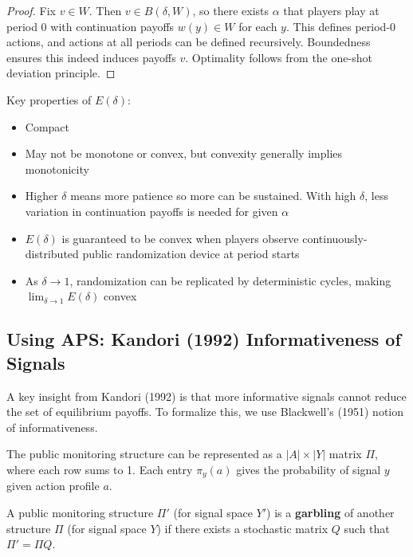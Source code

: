 \documentclass[11pt]{elegantbook_2}
\begin{document}
\begin{proof}
    Fix $v\in W$. Then $v\in B(\delta,W)$, so there exists $\alpha$ that players play at period 0 with continuation payoffs $w(y)\in W$ for each $y$. This defines period-0 actions, and actions at all periods can be defined recursively. Boundedness ensures this indeed induces payoffs $v$. Optimality follows from the one-shot deviation principle.
\end{proof}

Key properties of $E(\delta)$:
\begin{itemize}
    \item Compact
    \item May not be monotone or convex, but convexity generally implies monotonicity
    \item Higher $\delta$ means more patience so more can be sustained. With high $\delta$, less variation in continuation payoffs is needed for given $\alpha$
    \item $E(\delta)$ is guaranteed to be convex when players observe continuously-distributed public randomization device at period starts
    \item As $\delta\rightarrow 1$, randomization can be replicated by deterministic cycles, making $\lim_{\delta\rightarrow 1}E(\delta)$ convex
\end{itemize}


\subsection{Using APS: Kandori (1992) Informativeness of Signals}
A key insight from Kandori (1992) is that more informative signals cannot reduce the set of equilibrium payoffs. To formalize this, we use Blackwell's (1951) notion of informativeness.

\begin{definition}
    The public monitoring structure can be represented as a $|A|\times|Y|$ matrix $\Pi$, where each row sums to 1. Each entry $\pi_y(a)$ gives the probability of signal $y$ given action profile $a$.
\end{definition}

\begin{definition}[Garbling]
    A public monitoring structure $\Pi'$ (for signal space $Y'$) is a \textbf{garbling} of another structure $\Pi$ (for signal space $Y$) if there exists a stochastic matrix $Q$ such that $\Pi'=\Pi Q$.
\end{definition}
\end{document}
